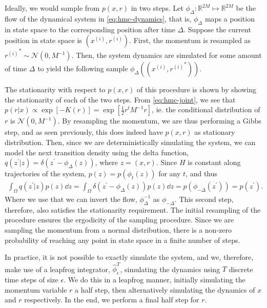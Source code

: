 \newcommand{\newx}{x^{\prime}}
\newcommand{\newr}{{r^{\prime}}}
\newcommand{\oldx}{{x^{(i)}}}
\newcommand{\oldr}{{r^{(i)}}}
\newcommand{\nextx}{x^{(i+1)}}
\newcommand{\nextr}{{r^{(i+1)}}}

Ideally, we would sample from $p(x, r)$ in two steps.
Let $\phi_\Delta: \mathbb{R}^{2M} \mapsto \mathbb{R}^{2M}$ be the flow of the dynamical system in \cref{eq:hmc-dynamics}, that is, $\phi_\Delta$ maps a position in state space to the corresponding position after time $\Delta$.
Suppose the current position in state space is $(\oldx, \oldr)$. 
First, the momentum is resampled as $\oldr^\ast\sim \mathcal{N}(0, M^{-1})$.
Then, the system dynamics are simulated for some amount of time $\Delta$ to yield the following sample $\phi_\Delta((\oldx, \oldr^\ast))$.

The stationarity with respect to $p(x, r)$ of this procedure is shown by showing the stationarity of each of the two steps.
From \cref{eq:hmc-joint}, we see that $p(r|x) \propto \exp[-K(r)] = \exp[\frac{1}{2}r^tM^{-1}r]$, ie. the conditional distribution of $r$ is $\mathcal{N}(0, M^{-1})$.
By resampling the momentum, we are thus performing a Gibbs step, and as seen previously, this does indeed have $p(x, r)$ as stationary distribution.
Then, since we are deterministically simulating the system, we can model the next transition density using the delta function, $q(z^\prime|z) = \delta(z^\prime - \phi_\Delta(z))$, where $z=(x, r)$. 
Since $H$ is constant along trajectories of the system, $p(z) =p(\phi_t(z))$ for any $t$, and thus
\begin{align} \label{eq:}
    \int_{\Omega} q(z^\prime| z ) p(z) \dd{z} = \int_{\Omega} \delta(z^\prime - \phi_\Delta(z))p(z) \dd{z} 
    = p(\phi_{-\Delta}(z^\prime)) = p(z^\prime).
\end{align}
Where we use that we can invert the flow, $\phi^{-1}_\Delta$ as $\phi_{-\Delta}$. 
This second step, therefore, also satisfies the stationarity requirement.
The initial resampling of the procedure ensures the ergodicity of the sampling procedure.
Since we are sampling the momentum from a normal distribution, there is a non-zero probability of reaching any point in state space in a finite number of steps.

In practice, it is not possible to exactly simulate the system, and we, therefore, make use of a leapfrog integrator, $\hat{\phi}_\epsilon^T$, simulating the dynamics using $T$ discrete time steps of size $\epsilon$. 
We do this in a leapfrog manner, initially simulating the momentum variable $r$ a half step, then alternatively simulating the dynamics of $x$ and $r$ respectively.
In the end, we perform a final half step for $r$.

